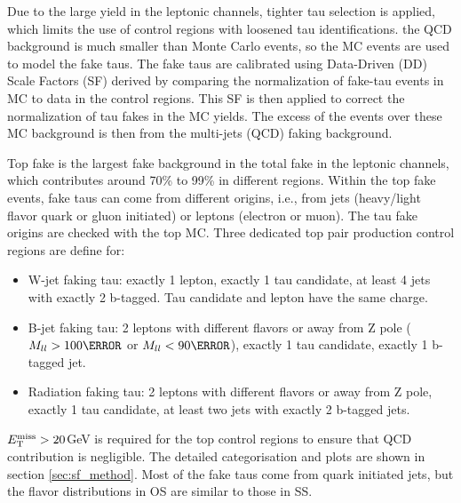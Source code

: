 Due to the large yield in the leptonic channels, tighter tau selection is applied, which limits the use of control regions with loosened tau identifications. the QCD background is much smaller than Monte Carlo events, so the MC events are used to model the fake taus. The fake taus are calibrated using Data-Driven (DD) Scale Factors (SF) derived by comparing the normalization of fake-tau events in MC to data in the control regions.
This SF is then applied to correct the normalization of tau fakes in the MC yields. The excess of the events over these MC background is then from the multi-jets (QCD) faking background.

Top fake is the largest fake background in the total fake in the leptonic channels, which contributes around 70\% to 99\% in different regions.
Within the top fake events, fake taus can come from different origins, i.e., from jets (heavy/light flavor quark or gluon initiated) 
or leptons (electron or muon). The tau fake 
origins are checked with the top MC. Three dedicated top pair production control regions are define for:
\begin{itemize}
\item{W-jet faking tau: exactly 1 lepton, exactly 1 tau candidate, at least 4 jets with exactly 2 b-tagged. Tau candidate and lepton have the same charge.}
\item{B-jet faking tau: 2 leptons with different flavors or away from Z pole ($M_{ll}>100\GeV$ or $M_{ll}<90\GeV$), exactly 1 tau candidate, exactly 1 b-tagged jet.}
\item{Radiation faking tau: 2 leptons with different flavors or away from Z pole, exactly 1 tau candidate, at least two jets with exactly 2 b-tagged jets.}
\end{itemize}
$E_{\text{T}}^{\text{miss}} > 20$GeV is required for the top control regions to ensure that QCD contribution is negligible. The detailed categorisation and plots are shown in section \ref{sec:sf_method}.
Most of the fake taus come from quark initiated jets, but the flavor distributions in OS are similar to those in SS. 


